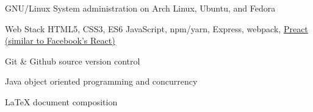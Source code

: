 

\begin{cvskills}

  \cvskill
    {GNU/Linux} %
    {System administration on Arch Linux, Ubuntu, and Fedora} %

  \cvskill
    {Web Stack} %
    {HTML5, CSS3, ES6 JavaScript, npm/yarn, Express, webpack, \href{https://preactjs.com/}{Preact (similar to Facebook's React)}} %

  \cvskill
    {Git \& Github} %
    {source version control} %

  \cvskill
    {Java} %
    {object oriented programming and concurrency} %

  \cvskill
    {LaTeX} %
    {document composition} %

\end{cvskills}
